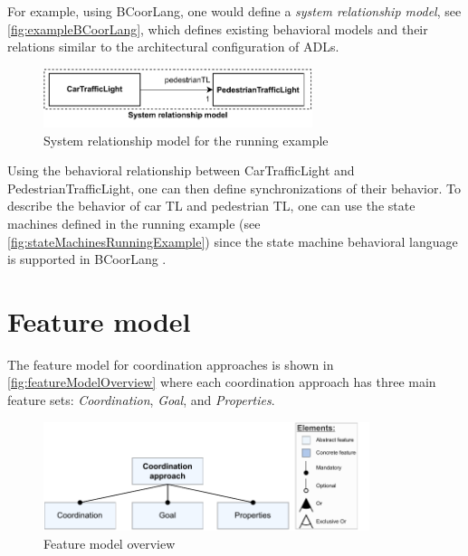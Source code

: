 \documentclass[runningheads]{llncs}
\begin{document}
For example, using BCoorLang, one would define a \textit{system relationship model}, see \autoref{fig:exampleBCoorLang}, which defines existing behavioral models and their relations similar to the architectural configuration of ADLs.

\begin{figure}[ht]
	\centering
	\includegraphics[width=0.7\textwidth]{images/running_example_BCorrLang}
	\caption{System relationship model for the running example}
	\label{fig:exampleBCoorLang}
\end{figure}

Using the behavioral relationship between \textsf{CarTrafficLight} and \textsf{PedestrianTrafficLight}, one can then define synchronizations of their behavior.
To describe the behavior of car TL and pedestrian TL, one can use the state machines defined in the running example (see \autoref{fig:stateMachinesRunningExample}) since the state machine behavioral language is supported in BCoorLang \cite{krauterBehavioralConsistencyMultimodeling2023}.


\section{Feature model} \label{sec:features}

The feature model for coordination approaches is shown in \autoref{fig:featureModelOverview} where each coordination approach has three main feature sets: \textit{Coordination}, \textit{Goal}, and \textit{Properties}.

\begin{figure}[ht]
	\centering
	\includegraphics[width=0.85\textwidth]{images/root}
	\caption{Feature model overview}
	\label{fig:featureModelOverview}
\end{figure}
\end{document}
